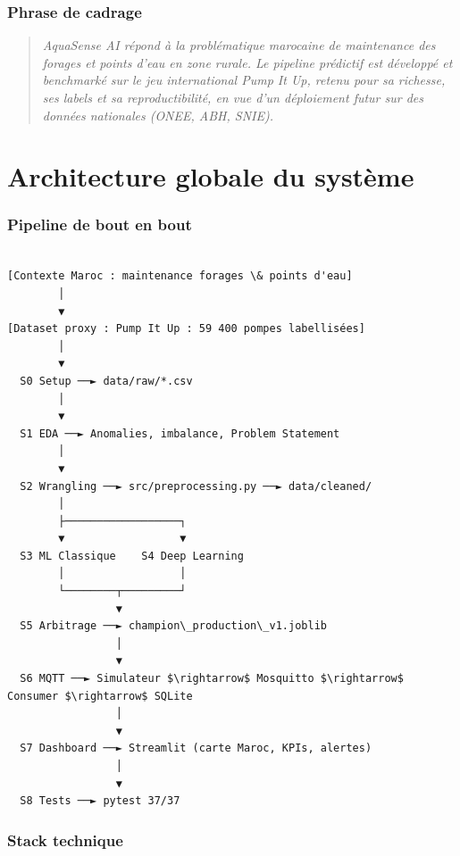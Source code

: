 \documentclass[11pt,a4paper]{report}
\begin{document}
\subsection{Phrase de cadrage}

\begin{quote}

\textit{AquaSense AI répond à la problématique marocaine de maintenance des forages et points d'eau en zone rurale. Le pipeline prédictif est développé et benchmarké sur le jeu international Pump It Up, retenu pour sa richesse, ses labels et sa reproductibilité, en vue d'un déploiement futur sur des données nationales (ONEE, ABH, SNIE).}

\end{quote}

\chapter{Architecture globale du système}

\subsection{Pipeline de bout en bout}

\begin{lstlisting}

[Contexte Maroc : maintenance forages \& points d'eau]
        │
        ▼
[Dataset proxy : Pump It Up : 59 400 pompes labellisées]
        │
        ▼
  S0 Setup ──► data/raw/*.csv
        │
        ▼
  S1 EDA ──► Anomalies, imbalance, Problem Statement
        │
        ▼
  S2 Wrangling ──► src/preprocessing.py ──► data/cleaned/
        │
        ├──────────────────┐
        ▼                  ▼
  S3 ML Classique    S4 Deep Learning
        │                  │
        └────────┬─────────┘
                 ▼
  S5 Arbitrage ──► champion\_production\_v1.joblib
                 │
                 ▼
  S6 MQTT ──► Simulateur $\rightarrow$ Mosquitto $\rightarrow$ Consumer $\rightarrow$ SQLite
                 │
                 ▼
  S7 Dashboard ──► Streamlit (carte Maroc, KPIs, alertes)
                 │
                 ▼
  S8 Tests ──► pytest 37/37

\end{lstlisting}

\subsection{Stack technique}
\end{document}
